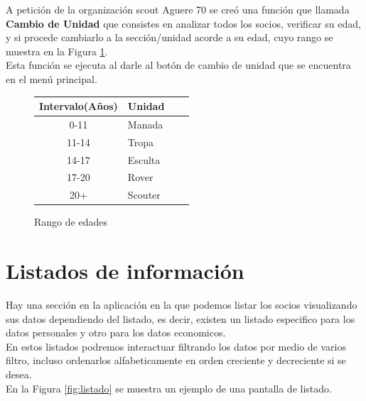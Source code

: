 A petición de la organización scout Aguere 70 se creó una función que llamada \textbf{Cambio de Unidad} que consistes en analizar todos los socios, verificar su edad, y si procede cambiarlo a la sección/unidad acorde a su edad,
cuyo rango se muestra en la Figura \ref{fig:rango}.\\

Esta función se ejecuta al darle al botón de cambio de unidad que se encuentra en el menú principal.\\

\begin{figure}[H]
\begin{center}
\begin{tabular}{c|p{25mm}c|p{25mm}|} \hline 
\textbf{Intervalo(Años)} & \textbf{Unidad} \\ \hline
0-11 &
Manada
\\
\hline

11-14 &
Tropa
\\
\hline

14-17 &
Esculta
\\
\hline

17-20 &
Rover
\\
\hline

20+ & 
Scouter
\\
\hline
\end{tabular}
\caption{Rango de edades}
\label{fig:rango}
\end{center}
\end{figure}

\section{Listados de información}
\label{3:sec4}

Hay una sección en la aplicación en la que podemos listar los socios visualizando sus datos dependiendo del listado, es decir, existen un listado especifico para los datos personales y otro para los datos economicos.\\

En estos listados podremos interactuar filtrando los datos por medio de varios filtro, incluso ordenarlos alfabeticamente en orden creciente y decreciente si se desea.\\

En la Figura \ref{fig:listado} se muestra un ejemplo de una pantalla de listado.


